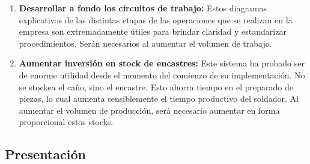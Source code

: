 \documentclass[a4paper,10pt,titlepage]{article}
\begin{document}
\begin{enumerate}
\item \textbf{Desarrollar a fondo los circuitos de trabajo:} Estos diagramas explicativos de las distintas etapas de las operaciones que se realizan en la empresa son extremadamente \'utiles para brindar claridad y estandarizar procedimientos. Ser\'an necesarios al aumentar el volumen de trabajo.

\item \textbf{Aumentar inversi\'on en stock de encastres:} Este sistema ha probado ser de enorme utilidad desde el momento del comienzo de su implementaci\'on. No se stockea el ca\~no, sino el encastre. Esto ahorra tiempo en el preparado de piezas, lo cual aumenta sensiblemente el tiempo productivo del soldador. Al aumentar el volumen de producci\'on, ser\'a necesario aumentar en forma proporcional estos stocks.
\end{enumerate}


\newpage
\vspace*{\fill}
\begin{center}
\begingroup
\titlerule
\vspace{1cm}
\section{Presentaci\'on}
\vspace{1cm}
\titlerule
\endgroup
\end{center}
\vspace*{\fill}
\end{document}
